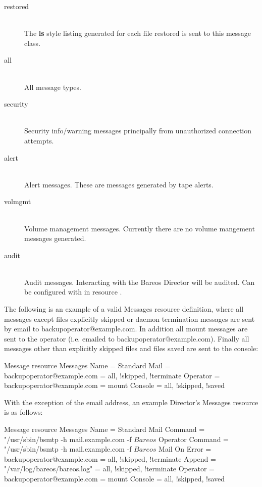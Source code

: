 \begin{description}
\item [restored] \hfill \\
The {\bf ls} style listing generated for each file restored is sent to
this message class.

\item [all] \hfill \\
All message types.

\item [security] \hfill \\
Security info/warning messages principally from unauthorized
connection attempts.

\item [alert] \hfill \\
Alert messages. These are messages generated by tape alerts.

\item [volmgmt] \hfill \\
Volume management messages. Currently there are no volume mangement
messages generated.

\item [audit] \hfill \\
Audit messages. Interacting with the Bareos Director will be audited.
Can be configured with in resource .

\end{description}

The following is an example of a valid Messages resource definition, where
all messages except files explicitly skipped or daemon termination messages
are sent by email to backupoperator@example.com.  In addition all mount messages
are sent to the operator (i.e.  emailed to backupoperator@example.com).  Finally
all messages other than explicitly skipped files and files saved are sent
to the console:

\begin{bconfig}{Message resource}
Messages {
  Name = Standard
  Mail = backupoperator@example.com = all, !skipped, !terminate
  Operator = backupoperator@example.com = mount
  Console = all, !skipped, !saved
}
\end{bconfig}

With the exception of the email address,
an example Director's Messages resource is as follows:

\begin{bconfig}{Message resource}
Messages {
  Name = Standard
  Mail Command = "/usr/sbin/bsmtp -h mail.example.com  -f \"\(Bareos\) %
  Operator Command = "/usr/sbin/bsmtp -h mail.example.com -f \"\(Bareos\) %
  Mail On Error = backupoperator@example.com = all, !skipped, !terminate
  Append = "/var/log/bareos/bareos.log" = all, !skipped, !terminate
  Operator = backupoperator@example.com = mount
  Console = all, !skipped, !saved
}
\end{bconfig}
